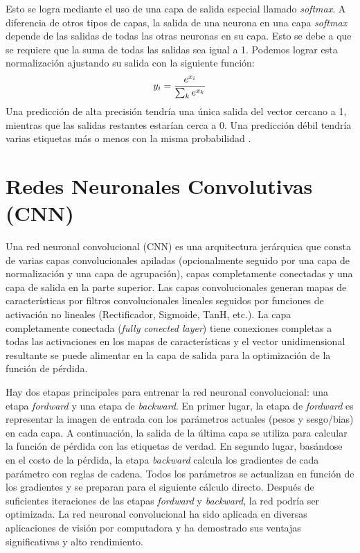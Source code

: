     Esto se logra mediante el uso de una capa de salida especial llamado \textit{softmax}. A diferencia de otros tipos de capas, la salida de una neurona en una capa \textit{softmax} depende de las salidas de todas las otras neuronas en su capa. Esto se debe a que se requiere que la suma de todas las salidas sea igual a 1. Podemos lograr esta normalización ajustando su salida con la siguiente función:
    \begin{equation}
        \centering
        y_i=\frac{e^{x_i}}{\sum_k e^{x_k}}
    \end{equation}
    Una predicción de alta precisión tendría una única salida del vector cercano a 1, mientras que las salidas restantes estarían cerca a 0. Una predicción débil tendría varias etiquetas más o menos con la misma probabilidad \cite{dlBook}.
 

\section{Redes Neuronales Convolutivas (CNN)}\label{sec:cnn}

Una red neuronal convolucional (CNN) es una arquitectura jerárquica \cite{LeCun} que consta de varias capas convolucionales apiladas (opcionalmente seguido por una capa de normalización y una capa de agrupación), capas completamente conectadas y una capa de salida en la parte superior. Las capas convolucionales generan mapas de características por filtros convolucionales lineales seguidos por funciones de activación no lineales (Rectificador, Sigmoide, TanH, etc.). La capa completamente conectada (\textit{fully conected layer}) tiene conexiones completas a todas las activaciones en los mapas de características y el vector unidimensional resultante se puede alimentar en la capa de salida para la optimización de la función de pérdida.

Hay dos etapas principales para entrenar la red neuronal convolucional: una etapa \textit{fordward}  y una etapa de \textit{backward}.  En primer lugar, la etapa de \textit{fordward} es representar la imagen de entrada con los parámetros actuales (pesos y sesgo/bias) en cada capa. A continuación, la salida de la última capa se utiliza para calcular la función de pérdida con las etiquetas de verdad. En segundo lugar, basándose en el costo de la pérdida, la etapa \textit{backward} calcula los gradientes de cada parámetro con reglas de cadena. Todos los parámetros se actualizan en función de los gradientes y se preparan para el siguiente cálculo directo. Después de suficientes iteraciones de las etapas \textit{fordward} y \textit{backward}, la red podría ser optimizada. La red neuronal convolucional ha sido aplicada en diversas aplicaciones de visión por computadora y ha demostrado sus ventajas significativas y alto rendimiento.

